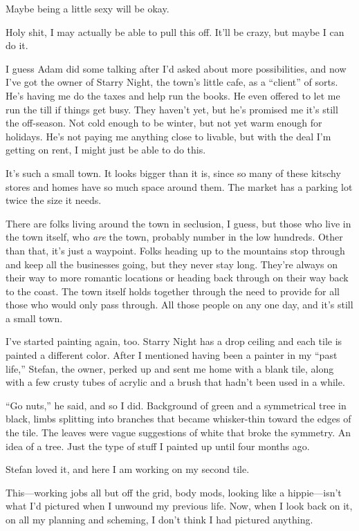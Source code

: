 Maybe being a little sexy will be okay.

\secdiv{}

\noindent Holy shit, I may actually be able to pull this off. It'll be crazy, but maybe I can do it.

I guess Adam did some talking after I'd asked about more possibilities, and now I've got the owner of Starry Night, the town's little cafe, as a ``client'' of sorts. He's having me do the taxes and help run the books. He even offered to let me run the till if things get busy. They haven't yet, but he's promised me it's still the off-season. Not cold enough to be winter, but not yet warm enough for holidays. He's not paying me anything close to livable, but with the deal I'm getting on rent, I might just be able to do this.

It's such a small town. It looks bigger than it is, since so many of these kitschy stores and homes have so much space around them. The market has a parking lot twice the size it needs.

There are folks living around the town in seclusion, I guess, but those who live in the town itself, who \emph{are} the town, probably number in the low hundreds. Other than that, it's just a waypoint. Folks heading up to the mountains stop through and keep all the businesses going, but they never stay long. They're always on their way to more romantic locations or heading back through on their way back to the coast. The town itself holds together through the need to provide for all those who would only pass through. All those people on any one day, and it's still a small town.

I've started painting again, too. Starry Night has a drop ceiling and each tile is painted a different color. After I mentioned having been a painter in my ``past life,'' Stefan, the owner, perked up and sent me home with a blank tile, along with a few crusty tubes of acrylic and a brush that hadn't been used in a while.

``Go nuts,'' he said, and so I did. Background of green and a symmetrical tree in black, limbs splitting into branches that became whisker-thin toward the edges of the tile. The leaves were vague suggestions of white that broke the symmetry. An idea of a tree. Just the type of stuff I painted up until four months ago.

Stefan loved it, and here I am working on my second tile.

This---working jobs all but off the grid, body mods, looking like a hippie---isn't what I'd pictured when I unwound my previous life. Now, when I look back on it, on all my planning and scheming, I don't think I had pictured anything.

